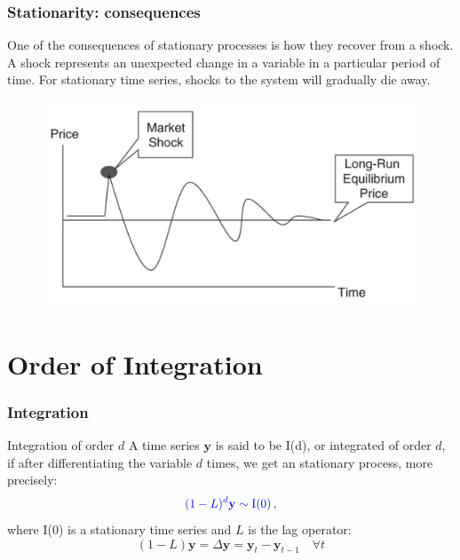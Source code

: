 \documentclass{beamer}
\begin{document}
\begin{frame}
\frametitle{Stationarity: consequences}
One of the consequences of stationary processes is how they recover from a shock. A shock represents an unexpected change in a variable in a particular period of time. For stationary time series, shocks to the system will gradually die away. 
\begin{figure}
\includegraphics[width=0.6\paperwidth]{img/shock}
\end{figure}
\end{frame}


\section{Order of Integration}
\begin{frame}
\frametitle{Integration }
\begin{block}{Integration of order $d$}
A time series $\mathbf{y}$ is said to be I(d), or integrated of order $d$, if after
differentiating the variable $d$ times, we get an stationary process, more precisely:
\[
{\color{blue}
(1-L)^d \mathbf{y} \sim \text{I(0)}} \, ,
\]
\noindent where I(0) is a stationary time series and $L$ is the lag operator:
\[
(1-L)\mathbf{y} = \Delta \mathbf{y}=\mathbf{y}_t  -\mathbf{y}_{t-1} \quad \forall t
\]
\end{block}
\end{frame}
\end{document}
